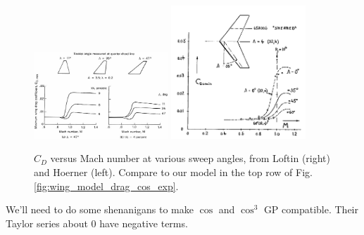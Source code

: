 \documentclass[12pt]{article}
\begin{document}
\begin{figure}[hbt!]
    \centering
    \includegraphics[width=0.45\textwidth]{figures/wing_drag_model/loftin_sweep}
    \includegraphics[width=0.45\textwidth]{figures/wing_drag_model/hoerner_fig_15_31}
    \caption{\label{fig:wing_drag_vs_sweep_refs} $C_D$ versus Mach number at various sweep angles, from Loftin \cite{Loftin1985} (right) and Hoerner \cite{Hoerner1965} (left). Compare to our model in the top row of Fig. \ref{fig:wing_model_drag_cos_exp}.}
\end{figure}




We'll need to do some shenanigans to make $\cos$ and $\cos^3$ GP compatible. Their Taylor series about 0 have negative terms.

\printbibliography
\end{document}
